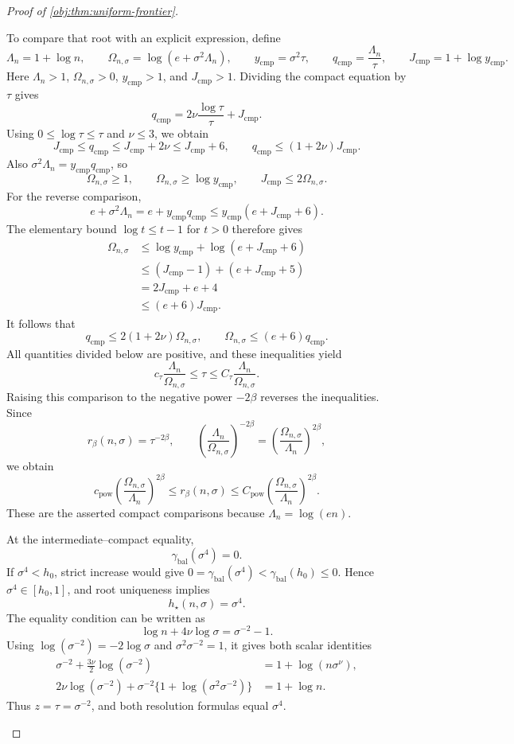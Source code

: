 \documentclass[11pt]{article}
\begin{document}
\begin{proof}[Proof of \cref{obj:thm:uniform-frontier}]
\begin{enumerate}
To compare that root with an explicit expression, define
\[
\Lambda_n=1+\log n,\qquad
\Omega_{n,\sigma}=\log(e+\sigma^2\Lambda_n),\qquad
y_{\mathrm{cmp}}=\sigma^2\tau,\qquad
q_{\mathrm{cmp}}=\frac{\Lambda_n}{\tau},\qquad
J_{\mathrm{cmp}}=1+\log y_{\mathrm{cmp}}.
\]
Here \(\Lambda_n>1\), \(\Omega_{n,\sigma}>0\),
\(y_{\mathrm{cmp}}>1\), and \(J_{\mathrm{cmp}}>1\). Dividing the compact
equation by \(\tau\) gives
\[
q_{\mathrm{cmp}}
=2\nu\frac{\log\tau}{\tau}+J_{\mathrm{cmp}}.
\]
Using \(0\le\log\tau\le\tau\) and \(\nu\le3\), we obtain
\[
J_{\mathrm{cmp}}\le q_{\mathrm{cmp}}
\le J_{\mathrm{cmp}}+2\nu
\le J_{\mathrm{cmp}}+6,
\qquad
q_{\mathrm{cmp}}\le(1+2\nu)J_{\mathrm{cmp}}.
\]
Also \(\sigma^2\Lambda_n=y_{\mathrm{cmp}}q_{\mathrm{cmp}}\), so
\[
\Omega_{n,\sigma}\ge1,\qquad
\Omega_{n,\sigma}\ge\log y_{\mathrm{cmp}},
\qquad
J_{\mathrm{cmp}}\le2\Omega_{n,\sigma}.
\]
For the reverse comparison,
\[
e+\sigma^2\Lambda_n
=e+y_{\mathrm{cmp}}q_{\mathrm{cmp}}
\le y_{\mathrm{cmp}}(e+J_{\mathrm{cmp}}+6).
\]
The elementary bound \(\log t\le t-1\) for \(t>0\) therefore gives
\[
\begin{aligned}
\Omega_{n,\sigma}
&\le\log y_{\mathrm{cmp}}+\log(e+J_{\mathrm{cmp}}+6)\\
&\le(J_{\mathrm{cmp}}-1)+(e+J_{\mathrm{cmp}}+5)\\
&=2J_{\mathrm{cmp}}+e+4\\
&\le(e+6)J_{\mathrm{cmp}}.
\end{aligned}
\]
It follows that
\[
q_{\mathrm{cmp}}\le2(1+2\nu)\Omega_{n,\sigma},
\qquad
\Omega_{n,\sigma}\le(e+6)q_{\mathrm{cmp}}.
\]
All quantities divided below are positive, and these inequalities yield
\[
c_\tau\frac{\Lambda_n}{\Omega_{n,\sigma}}
\le\tau
\le C_\tau\frac{\Lambda_n}{\Omega_{n,\sigma}}.
\]
Raising this comparison to the negative power \(-2\beta\) reverses the
inequalities. Since
\[
r_\beta(n,\sigma)=\tau^{-2\beta},
\qquad
\left(\frac{\Lambda_n}{\Omega_{n,\sigma}}\right)^{-2\beta}
=\left(\frac{\Omega_{n,\sigma}}{\Lambda_n}\right)^{2\beta},
\]
we obtain
\[
c_{\mathrm{pow}}
\left(\frac{\Omega_{n,\sigma}}{\Lambda_n}\right)^{2\beta}
\le r_\beta(n,\sigma)
\le C_{\mathrm{pow}}
\left(\frac{\Omega_{n,\sigma}}{\Lambda_n}\right)^{2\beta}.
\]
These are the asserted compact comparisons because
\(\Lambda_n=\log(en)\).

At the intermediate--compact equality,
\[
\gamma_{\mathrm{bal}}(\sigma^4)=0.
\]
If \(\sigma^4<h_0\), strict increase would give
\(0=\gamma_{\mathrm{bal}}(\sigma^4)<\gamma_{\mathrm{bal}}(h_0)\le0\).
Hence \(\sigma^4\in[h_0,1]\), and root uniqueness implies
\[
h_\star(n,\sigma)=\sigma^4.
\]
The equality condition can be written as
\[
\log n+4\nu\log\sigma=\sigma^{-2}-1.
\]
Using \(\log(\sigma^{-2})=-2\log\sigma\) and
\(\sigma^2\sigma^{-2}=1\), it gives both scalar identities
\[
\begin{aligned}
\sigma^{-2}+\frac{3\nu}{2}\log(\sigma^{-2})
&=1+\log(n\sigma^\nu),\\
2\nu\log(\sigma^{-2})
+\sigma^{-2}\{1+\log(\sigma^2\sigma^{-2})\}
&=1+\log n.
\end{aligned}
\]
Thus \(z=\tau=\sigma^{-2}\), and both resolution formulas equal \(\sigma^4\).


\end{enumerate}
\end{proof}
\end{document}
